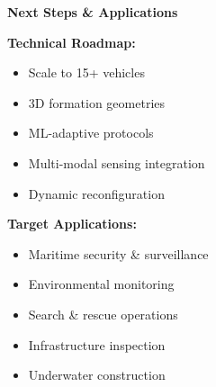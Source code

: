 
\begin{center}
\textbf{\large Next Steps \& Applications}
\end{center}

\vspace{0.2em}

\begin{tcolorbox}[colback=wasppink!10, colframe=wasppink, boxrule=0.5pt]
\textbf{Technical Roadmap:}
\begin{itemize}[leftmargin=1em, itemsep=0.05em]
    \item Scale to 15+ vehicles
    \item 3D formation geometries  
    \item ML-adaptive protocols
    \item Multi-modal sensing integration
    \item Dynamic reconfiguration
\end{itemize}
\end{tcolorbox}

\vspace{0.2em}

\begin{tcolorbox}[colback=waspgrey!10, colframe=waspgrey, boxrule=0.5pt]
\textbf{Target Applications:}
\begin{itemize}[leftmargin=1em, itemsep=0.05em]
    \item Maritime security \& surveillance
    \item Environmental monitoring
    \item Search \& rescue operations
    \item Infrastructure inspection
    \item Underwater construction
\end{itemize}
\end{tcolorbox}
